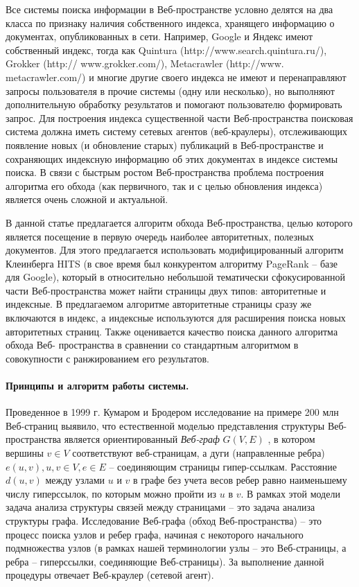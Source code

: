 Все системы поиска информации в Веб-пространстве условно делятся на два класса по признаку наличия собственного индекса, хранящего информацию о документах, опубликованных в сети. Например, Google и Яндекс имеют собственный индекс, тогда как Quintura (http://www.search.quintura.ru/), Grokker (http:// www.grokker.com/), Metacrawler (http://www. metacrawler.com/) и многие другие своего индекса не имеют и перенаправляют запросы пользователя в прочие системы (одну или несколько), но выполняют дополнительную обработку результатов и помогают пользователю формировать запрос. Для построения индекса существенной части Веб-пространства поисковая система должна иметь систему сетевых агентов (веб-краулеры), отслеживающих появление новых (и обновление старых) публикаций в Веб-пространстве и сохраняющих индексную информацию об этих документах в индексе системы поиска. В связи с быстрым ростом Веб-пространства \cite{Kahle,HubermanAdamic} проблема построения алгоритма его обхода (как первичного, так и с целью обновления индекса) является очень сложной и актуальной.

В данной статье предлагается алгоритм обхода Веб-пространства, целью которого является посещение в первую очередь наиболее авторитетных, полезных документов. Для этого предлагается использовать модифицированный алгоритм Клеинберга HITS (в свое время был конкурентом алгоритму PageRank -- базе для Google), который в относительно небольшой тематически сфокусированной части Веб-пространства может найти страницы двух типов: авторитетные и индексные. В предлагаемом алгоритме авторитетные страницы сразу же включаются в индекс, а индексные используются для расширения поиска новых авторитетных страниц. Также оценивается качество поиска данного алгоритма обхода Веб- пространства в сравнении со стандартным алгоритмом в совокупности с ранжированием его результатов.

\paragraph{Принципы и алгоритм работы системы.} Проведенное в 1999 г. Кумаром и Бродером исследование \cite{BroderKumarMaghoul} на примере 200 млн Веб-страниц выявило, что естественной моделью представления структуры Веб-пространства является ориентированный \textit{Веб-граф} \(G(V,E)\) \cite{BroderKumarMaghoul}, в котором вершины \(v \in V\) соответствуют веб-страницам, а дуги (направленные ребра) \(e(u, v), u, v \in V, e \in E\) -- соединяющим страницы гипер-ссылкам. Расстояние \(d(u, v)\) между узлами \(u\) и \(v\) в графе без учета весов ребер равно наименьшему числу гиперссылок, по которым можно пройти из \(u\) в \(v\). В рамках этой модели задача анализа структуры связей между страницами -- это задача анализа структуры графа. Исследование Веб-графа (обход Веб-пространства) -- это процесс поиска узлов и ребер графа, начиная с некоторого начального подмножества узлов (в рамках нашей терминологии узлы -- это Веб-страницы, а ребра -- гиперссылки, соединяющие Веб-страницы). За выполнение данной процедуры отвечает Веб-краулер (сетевой агент).

